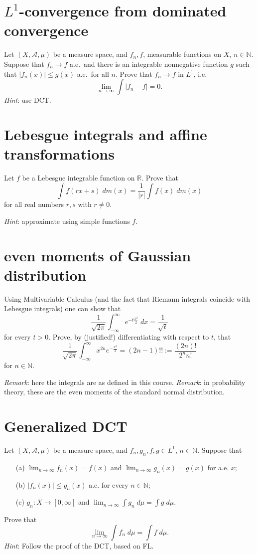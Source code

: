 \documentclass[lang=cn,11pt]{elegantbook}
\begin{document}
\section{$L^1$-convergence from dominated convergence}
Let $(X,\mathcal{A},\mu)$ be a measure space, and $f_n, f$, measurable functions on $X$, $n\in \mathbb{N}$. 
Suppose that $f_n\to f$ a.e.\ and there is an integrable nonnegative function $g$ such that $|f_n(x)|\le g(x)$ a.e.\ for all $n$. Prove that 
$f_n\to f$ in $L^1$, i.e.\
\[
  \lim_{n\to \infty} \int |f_n-f| =0.
\]
\textit{Hint}: use DCT.

\section{Lebesgue integrals and affine transformations}
  Let $f$ be a Lebesgue integrable function on $\mathbb{R}$. 
  Prove that 
  \[
    \int f(rx+s)\; d m(x)=\frac1{|r|}\int f(x)\; d m(x)
  \]
  for all real numbers $r,s$ with $r\ne0$.
  
  \textit{Hint}: approximate using simple functions $f$.


\section{even moments of Gaussian distribution}
    Using Multivariable Calculus (and the fact that Riemann integrals coincide with Lebesgue integrals) one can show that
    \[
      \frac1{\sqrt{2\pi}} \int_{-\infty}^\infty e^{-t\frac{x^2}{2}} \;d x = \frac1{\sqrt{t}}
    \]
    for every $t>0$.
    Prove, by (justified!) differentiating with respect to $t$, that
    \[
      \frac1{\sqrt{2\pi}} \int_{-\infty}^\infty x^{2n} e^{-\frac{x^2}{2}} = (2n-1)!!
      := \frac{(2n)!}{2^n n!}
    \]
    for $n\in \mathbb{N}$.

    \textit{Remark}: here the integrals are as defined in this course.
    \textit{Remark}: in probability theory, these are the even moments of the standard normal distribution.

\section{Generalized DCT}
  Let $(X, \mathcal{A}, \mu)$ be a measure space, and $f_n, g_n, f, g\in L^1$, $n\in \mathbb{N}$. Suppose that 
  \begin{itemize}
  \item[(a)]$\lim_{n\to\infty} f_n(x)=f(x)$ and $ \lim_{n\to\infty} g_n(x)=g(x)$ for a.e. $x$;
  \item[(b)] $|f_n(x)|\le g_n(x)$ a.e. for every $n\in \mathbb{N}$;
  \item[(c)]$g_n\colon X\to [0, \infty]$ and $\lim_{n\to \infty} \int g_n \; d \mu = \int g\; d\mu$.
  \end{itemize}
  Prove that
  \[
    \lim_{n\to \infty} \int f_n \; d\mu = \int f \; d\mu.
  \]
\textit{Hint}: Follow the proof of the DCT, based on FL.
\end{document}
